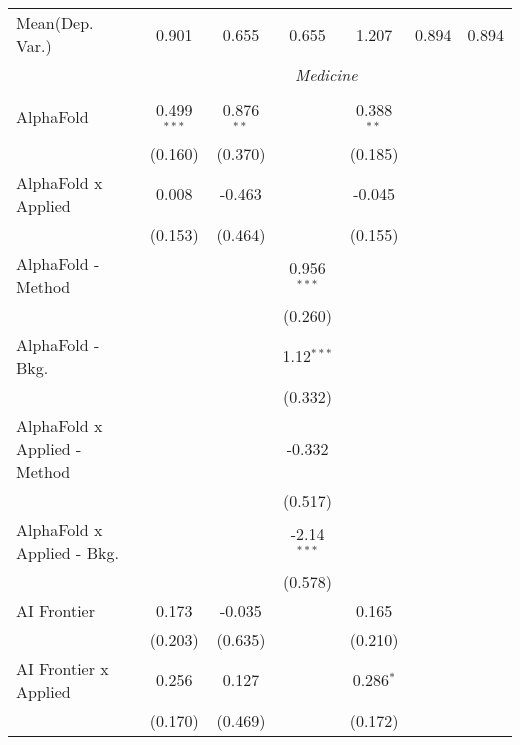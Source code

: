 \begin{tabular}{lcccccc}
Mean(Dep. Var.) & 0.901 & 0.655 & 0.655 & 1.207 & 0.894 & 0.894 \\
 & \multicolumn{6}{c}{\textit{Medicine}} \\ \\
   AlphaFold                      & 0.499$^{***}$ & 0.876$^{**}$ &               & 0.388$^{**}$ &        &   \\   
                                  & (0.160)       & (0.370)      &               & (0.185)      &        &   \\   
   AlphaFold x Applied            & 0.008         & -0.463       &               & -0.045       &        &   \\   
                                  & (0.153)       & (0.464)      &               & (0.155)      &        &   \\   
   AlphaFold - Method             &               &              & 0.956$^{***}$ &              &        &   \\   
                                  &               &              & (0.260)       &              &        &   \\   
   AlphaFold - Bkg.               &               &              & 1.12$^{***}$  &              &        &   \\   
                                  &               &              & (0.332)       &              &        &   \\   
   AlphaFold x Applied - Method   &               &              & -0.332        &              &        &   \\   
                                  &               &              & (0.517)       &              &        &   \\   
   AlphaFold x Applied - Bkg.     &               &              & -2.14$^{***}$ &              &        &   \\   
                                  &               &              & (0.578)       &              &        &   \\   
   AI Frontier                    & 0.173         & -0.035       &               & 0.165        &        &   \\   
                                  & (0.203)       & (0.635)      &               & (0.210)      &        &   \\   
   AI Frontier x Applied          & 0.256         & 0.127        &               & 0.286$^{*}$  &        &   \\   
                                  & (0.170)       & (0.469)      &               & (0.172)      &        &   \\   

\end{tabular}
